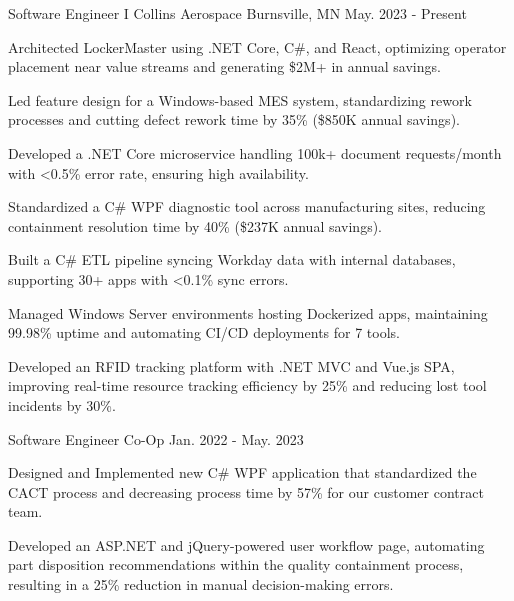 
\begin{cventries}
  \cventry
    {Software Engineer I} %
    {Collins Aerospace} %
    {Burnsville, MN} %
    {May. 2023 - Present} %
    {
      \begin{cvitems}
        \item {Architected LockerMaster using .NET Core, C\#, and React, optimizing operator placement near value streams and generating \$2M+ in annual savings.}
        \item {Led feature design for a Windows-based MES system, standardizing rework processes and cutting defect rework time by 35\% (\$850K annual savings).}
        \item {Developed a .NET Core microservice handling 100k+ document requests/month with <0.5\% error rate, ensuring high availability.}
        \item {Standardized a C\# WPF diagnostic tool across manufacturing sites, reducing containment resolution time by 40\% (\$237K annual savings).}
        \item {Built a C\# ETL pipeline syncing Workday data with internal databases, supporting 30+ apps with <0.1\% sync errors.}
        \item {Managed Windows Server environments hosting Dockerized apps, maintaining 99.98\% uptime and automating CI/CD deployments for 7 tools.}
        \item {Developed an RFID tracking platform with .NET MVC and Vue.js SPA, improving real-time resource tracking efficiency by 25\% and reducing lost tool incidents by 30\%.}
      \end{cvitems}
    }

  \cventry
    {Software Engineer Co-Op}
    {}
    {}
    {Jan. 2022 - May. 2023}
    {
      \begin{cvitems}
        \item {Designed and Implemented new C\# WPF application that standardized the CACT process and decreasing process time by 57\% for our customer contract team.}
        \item {Developed an ASP.NET and jQuery-powered user workflow page, automating part disposition recommendations within the quality containment process, resulting in a 25\% reduction in manual decision-making errors.}
      \end{cvitems}
    }


\end{cventries}
